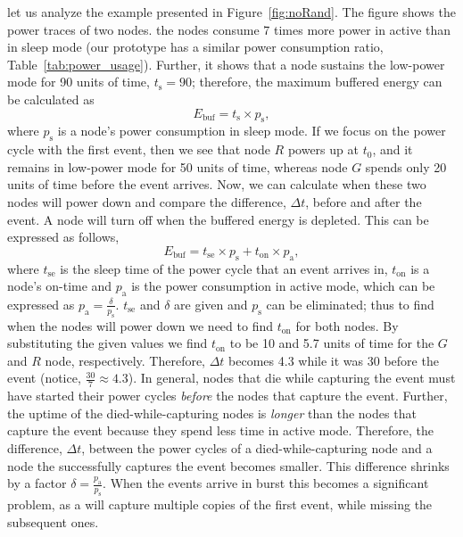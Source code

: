 \begin{itemize}[leftmargin=*]
	let us analyze the example presented in Figure~\ref{fig:noRand}. The figure shows the power traces of two nodes. the nodes consume 7 times more power in active than in sleep mode (our prototype has a similar power consumption ratio, Table~\ref{tab:power_usage}). Further, it shows that a node sustains the low-power mode for 90 units of time, $t_\text{s} = 90$; therefore, the maximum buffered energy can be calculated as 
	$$E_\text{buf}=t_\text{s} \times p_\text{s},$$
	where $p_\text{s}$ is a node's power consumption in sleep mode. If we focus on the power cycle with the first event, then we see that node $R$ powers up at $t_\text{0}$, and it remains in low-power mode for 50 units of time, whereas node $G$ spends only 20 units of time before the event arrives. Now, we can calculate when these two nodes will power down and compare the difference, $\Delta t$, before and after the event. A node will turn off when the buffered energy is depleted. This can be expressed as follows, 
	$$
	E_\text{buf} = t_\text{se} \times p_\text{s} + t_\text{on} \times p_\text{a},
	$$
	where $ t_\text{se}$ is the sleep time of the power cycle that an event arrives in, $t_\text{on}$ is a node's on-time and $p_\text{a}$ is the power consumption in active mode, which can be expressed as $p_\text{a}=\frac{\delta}{p_\text{s}}$. $ t_\text{se}$ and $ \delta$ are given and $p_\text{s}$ can be eliminated; thus to find when the nodes will power down we need to find $t_\text{on}$ for both nodes. By substituting the given values we find $t_\text{on}$ to be 10 and 5.7 units of time for the $G$ and $R$ node, respectively. Therefore, $\Delta t$ becomes 4.3 while it was 30 before the event (notice, $\frac{30}{7} \approx 4.3$). 
	In general, nodes that die while capturing the event must have started their power cycles \emph{before} the nodes that capture the event.
	Further, the uptime of the died-while-capturing nodes is \emph{longer}
	than the nodes that capture the event because they spend less time in
	active mode. Therefore, the difference,  $\Delta t$, between the power
	cycles of a died-while-capturing node and a node the successfully
	captures the event becomes smaller. This difference shrinks by a factor
	$\delta = \frac{p_\text{a}}{p_\text{s}}$.
	When the events arrive in burst this becomes a significant problem, as a \cis will capture multiple copies of the first event, while missing the subsequent ones. 


\end{itemize}
